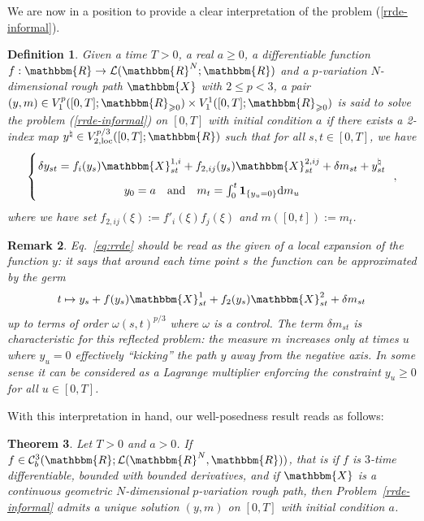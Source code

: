 \documentclass[11pt,reqno,oneside]{amsart}
\numberwithin{equation}{section}
\newcommand{\assign}{:=}
\newcommand{\mathd}{\mathrm{d}}
\newtheorem{theorem}{Theorem}
\newtheorem{definition}[theorem]{Definition}
\newtheorem{remark}[theorem]{Remark}
\begin{document}
\smallskip

We are now in a position to provide a clear interpretation of the problem (\ref{rrde-informal}).

\begin{definition}\label{def:sol-rrde}
Given a time $T > 0$, a real $a\geq 0$, a differentiable function $f :\mathbbm{R} \to \mathcal{L} (\mathbbm{R}^N ;\mathbbm{R})$ and a $p$-variation $N$-dimensional rough path $\mathbbm{X}$ with $2\leqslant p<3$, a pair $(y, m)\in  V^p_1 ([0, T] ; \mathbbm{R}_{\geqslant 0}) \times V^1_1 ([0, T] ;\mathbbm{R}_{\geqslant 0})$ is said to solve the problem (\ref{rrde-informal}) on $[0,T]$ with initial condition $a$ if there exists a 2-index map $y^\natural \in V^{p/3}_{2, \text{loc}}([0,T];\mathbbm{R})$ such that for all $s,t\in [0,T]$, we have
\begin{equation}
\left\lbrace
\arraycolsep=1pt\def\arraystretch{1.8}
  \begin{array}{c}
   \delta y_{s t} = f_i (y_s) \mathbbm{X}^{1,i}_{s t} + f_{2,ij} (y_s)
    \mathbbm{X}^{2,ij}_{s t} + \delta m_{s t} +y^\natural_{st} \\
    y_0=a \quad \text{and} \quad m_t=\int_0^t \mathbf{1}_{\{ y_u=0\}}  \mathd m_u 
  \end{array} \label{eq:rrde}
	\right. \ ,
\end{equation}
where we have set $f_{2,ij} (\xi) \assign f'_i (\xi)f_j (\xi)$ and $m([0,t]):=m_t$.
\end{definition}


\begin{remark}
Eq.~\eqref{eq:rrde} should be read as the given of a local expansion of the function $y$: it says that around each time point $s$ the function can be approximated by the germ 
$$
t \mapsto    y_s + f (y_s) \mathbbm{X}^1_{s t} + f_2 (y_s)
    \mathbbm{X}^2_{s t} + \delta m_{s t} 
$$
up to terms of order $\omega(s,t)^{p/3}$ where $\omega$ is a control. The term $ \delta m_{s t} $ is characteristic for this reflected problem: the measure $m$ increases only at times $u$ where $y_u=0$ effectively ``kicking'' the path $y$ away from the negative axis. In some sense it can be considered as a Lagrange multiplier enforcing the constraint $y_u \ge 0$ for all $u\in[0,T]$. 
\end{remark}

With this interpretation in hand, our well-posedness result reads as follows:
\begin{theorem} \label{th:main-wellposedness}
Let $T>0$ and $a>0$. If $f\in \mathcal{C}_b^3(\mathbbm{R};\mathcal{L}(\mathbbm{R}^N,\mathbbm{R}))$, that is if $f$ is $3$-time differentiable, bounded with bounded derivatives, and if $\mathbbm{X}$ is a continuous geometric $N$-dimensional $p$-variation rough path, then Problem~\eqref{rrde-informal} admits a unique solution $(y,m)$ on $[0,T]$ with initial condition $a$.
\end{theorem}
\end{document}
